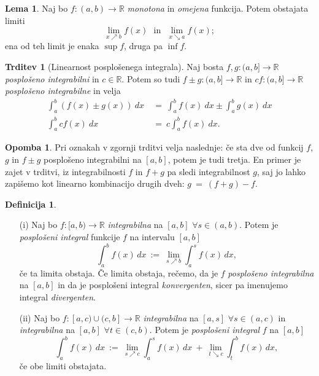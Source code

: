 \documentclass[11pt]{article}
\theoremstyle{definition}
\newtheorem{definicija}{Definicija}[section]
\theoremstyle{definition}
\newtheorem{trditev}{Trditev}[section]
\theoremstyle{definition}
\theoremstyle{theorem}
\newtheorem{lema}{Lema}
\newtheorem*{opomba}{Opomba}
\begin{document}
\begin{lema}

Naj bo $f:(a, b) \rightarrow \mathbb{R}$ \textit{monotona} in \textit{omejena} funkcija. Potem obstajata limiti
$$\lim_{x \nearrow b} f(x) ~~~\text{in}~~~ \lim_{x \searrow a} f(x);$$
ena od teh limit je enaka $\sup{f}$, druga pa $\inf{f}$.

\end{lema}
\vspace{0.5cm}

\begin{trditev}[Linearnost posplošenega integrala]

Naj bosta $f,g: (a, b] \rightarrow \mathbb{R}$ \textit{posplošeno integrabilni} in $c \in \mathbb{R}$. Potem so tudi $f \pm g:(a, b] \rightarrow \mathbb{R}$ in $cf:(a, b] \rightarrow \mathbb{R}$ \textit{posplošeno integrabilne} in velja 
\begin{align*}
\int_a^b \left( f(x) \pm g(x) \right)~dx ~&=~ \int_a^b f(x)~dx \pm \int_a^b g(x)~dx \\
\int_a^b c f(x)~dx ~&=~ c \int_a^b f(x)~dx.
\end{align*}

\end{trditev}
\vspace{0.5cm}

\begin{opomba}

Pri oznakah v zgornji trditvi velja naslednje: če sta dve od funkcij $f$, $g$ in $f \pm g$ posplošeno integrabilni na $[a, b]$, potem je tudi tretja. En primer je zajet v trditvi, iz integrabilnosti $f$ in $f+g$ pa sledi integrabilnost $g$, saj jo lahko zapišemo kot linearno kombinacijo drugih dveh: $g ~=~ (f+g) - f$.

\end{opomba}
\vspace{0.5cm}

\begin{definicija}
~
\begin{enumerate}

	\item[(i)] Naj bo $f:[a, b) \rightarrow \mathbb{R}$ \textit{integrabilna} na $[a, b]$ $\forall s \in (a, b)$. Potem je \textit{posplošeni integral} funkcije $f$ na intervalu $[a, b]$
	$$\int_a^b f(x)\,dx ~:=~ \lim_{s \nearrow b} \int_a^s f(x)\,dx,$$
	če ta limita obstaja. Če limita obstaja, rečemo, da je $f$ \textit{posplošeno integrabilna} na $[a, b]$ in da je posplošeni integral \textit{konvergenten}, sicer pa imenujemo integral \textit{divergenten}.
	
	\item[(ii)]	Naj bo $f:[a, c) \cup (c, b] \rightarrow \mathbb{R}$ \textit{integrabilna} na $[a, s]$ $\forall s \in (a, c)$ in \textit{integrabilna} na $[a, b]$ $\forall t \in (c, b)$. Potem je \textit{posplošeni integral} $f$ na $[a, b]$
	$$\int_a^b f(x)\,dx ~:=~ \lim_{s \nearrow c} \int_a^s f(x)\,dx ~+~ \lim_{t \searrow c} \int_t^b f(x)\,dx,$$
 če obe limiti obstajata.	
\end{enumerate}
\end{definicija}
\vspace{0.5cm}
\end{document}
